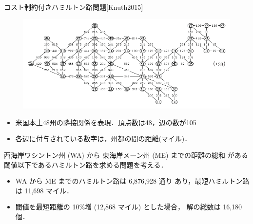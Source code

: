 \documentclass[dvipdfmx,10pt]{beamer}
\begin{document}
\begin{frame}{コスト制約付きハミルトン路問題[Knuth2015]}
  \begin{figure}[tb]
  \centering
  \includegraphics[width=0.8\linewidth]{fig/taocp_vol4fasc1b_p52_eq133.pdf}
  \end{figure}
  \begin{itemize}  
  \item 米国本土48州の隣接関係を表現．頂点数は48，辺の数が105
  \item 各辺に付与されている数字は，州都の間の距離(マイル)．
  \end{itemize}
  \begin{block}{}
    西海岸ワシントン州 (WA) から 東海岸メーン州 (ME) までの距離の総和
    がある閾値以下であるハミルトン路を求める問題を考える．
  \end{block}
  \begin{itemize}
  \item WA から ME までのハミルトン路は 6,876,928 通り
    あり，最短ハミルトン路は 11,698 マイル．
  \item 閾値を最短距離の 10\%増 (12,868 マイル) とした場合，
    解の総数は 16,180 個．
  \end{itemize}
\end{frame}
\end{document}
